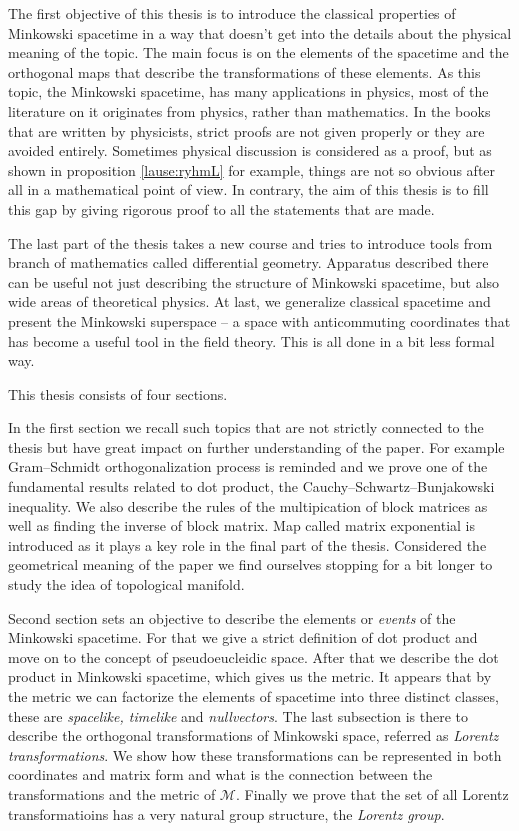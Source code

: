 \documentclass[12pt,a4paper,oneside]{article}
\theoremstyle{plain}
\theoremstyle{definition}
\numberwithin{equation}{section}
\def\M{{\mathcal M}}
\begin{document}
The first objective of this thesis is to introduce the 
classical properties of Minkowski spacetime in a way that 
doesn't get into the details about the physical meaning 
of the topic. The main focus is on the elements of the 
spacetime and the orthogonal maps that describe the 
transformations of these elements. As this topic, the 
Minkowski spacetime, has many applications in physics, 
most of the literature on it originates from physics, 
rather than mathematics. In the books that are written 
by physicists, strict proofs are not given properly or 
they are avoided entirely. Sometimes physical discussion 
is considered as a proof, but as shown in proposition 
\ref{lause:ryhmL} for example, things are not so obvious 
after all in a mathematical point of view. In contrary, 
the aim of this thesis is to fill this gap by giving rigorous 
proof to all the statements that are made.

The last part of the thesis takes a new course and tries 
to introduce tools from branch of mathematics called 
differential geometry. Apparatus described there can be 
useful not just describing the structure of Minkowski 
spacetime, but also wide areas of theoretical physics. 
At last, we generalize classical spacetime and present 
the Minkowski superspace -- a space with anticommuting 
coordinates that has become a useful tool in the 
field theory. This is all done in a bit less formal way.

This thesis consists of four sections.

In the first section we recall such topics that are not 
strictly connected to the thesis but have great impact 
on further understanding of the paper. For example 
Gram--Schmidt orthogonalization process is reminded and we 
prove one of the fundamental results related to dot 
product, the Cauchy--Schwartz--Bunjakowski inequality. 
We also describe the rules of the multipication of 
block matrices as well as finding the inverse of block 
matrix. Map called matrix exponential is introduced as 
it plays a key role in the final part of the thesis. 
Considered the geometrical meaning of the paper we find 
ourselves stopping for a bit longer to study the idea 
of topological manifold.

Second section sets an objective to describe the elements 
or \emph{events} of the Minkowski spacetime. For that we 
give a strict definition of dot product and move on to 
the concept of pseudoeucleidic space. After that we 
describe the dot product in Minkowski spacetime, which 
gives us the metric. It appears that by the metric we can 
factorize the elements of spacetime into three distinct 
classes, these are \emph{spacelike, timelike} and 
\emph{nullvectors}. The last subsection is there to 
describe the orthogonal transformations of Minkowski space, 
referred as \emph{Lorentz transformations}. We show how these 
transformations can be represented in both coordinates and 
matrix form and what is the connection between the 
transformations and the metric of $\M$. Finally we prove 
that the set of all Lorentz transformatioins has a very 
natural group structure, the \emph{Lorentz group}.
\end{document}
